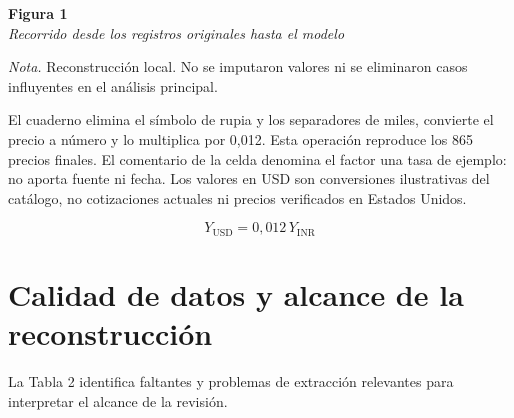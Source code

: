 \documentclass[12pt,letterpaper]{article}
\begin{document}
\begin{center}\begin{minipage}{\linewidth}\textbf{Figura 1}\\\textit{Recorrido desde los registros originales hasta el modelo}\par\begin{singlespace}\end{singlespace}\small\textit{Nota.} Reconstrucción local. No se imputaron valores ni se eliminaron casos influyentes en el análisis principal.\end{minipage}\end{center}
El cuaderno elimina el símbolo de rupia y los separadores de miles, convierte el precio a número y lo multiplica por 0,012. Esta operación reproduce los 865 precios finales. El comentario de la celda denomina el factor una tasa de ejemplo: no aporta fuente ni fecha. Los valores en USD son conversiones ilustrativas del catálogo, no cotizaciones actuales ni precios verificados en Estados Unidos.

\begin{equation*}Y_{\mathrm{USD}}=0{,}012\,Y_{\mathrm{INR}}\end{equation*}
\clearpage
\section*{Calidad de datos y alcance de la reconstrucción}
La Tabla 2 identifica faltantes y problemas de extracción relevantes para interpretar el alcance de la revisión.
\end{document}
